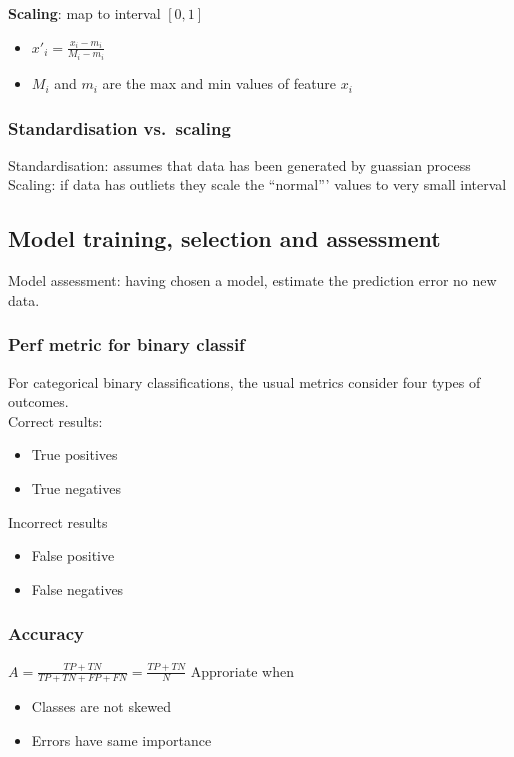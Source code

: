 \textbf{Scaling}: map to interval $ [0, 1] $
\begin{itemize}
\item $ x'_i = \frac{x_i - m_i}{M_i - m_i} $
\item $ M_i $ and $ m_i $ are the max and min  values of feature $ x_
  i $
\end{itemize}

\subsubsection{Standardisation vs.\ scaling}
Standardisation: assumes that data has been generated by guassian
process \\
Scaling: if data has outliets they scale the ``normal''' values to
very small interval

\subsection{Model training, selection and assessment}
Model assessment: having chosen a model, estimate the prediction error
no new data.

\subsubsection{Perf metric for binary classif}
For categorical binary classifications, the usual metrics consider
four types of outcomes. \\
Correct results:
\begin{itemize}
\item True positives
\item True negatives
\end{itemize}
Incorrect results
\begin{itemize}
\item False positive
\item False negatives
\end{itemize}

\subsubsection{Accuracy}

$ A = \frac{TP + TN} {TP + TN + FP + FN} = \frac{TP + TN}{N} $
Approriate when
\begin{itemize}
\item Classes are not skewed
\item Errors have same importance
\end{itemize}

